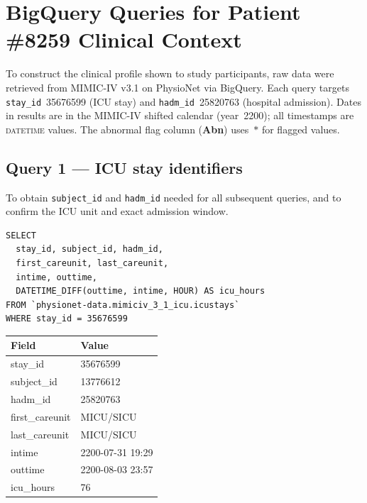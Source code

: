 \documentclass[12pt, a4paper]{article}
\begin{document}
\clearpage
\section{BigQuery Queries for Patient \#8259 Clinical Context}
\label{app:bigquery}

To construct the clinical profile shown to study participants, raw data were
retrieved from MIMIC-IV v3.1 on PhysioNet via BigQuery. Each query targets
\texttt{stay\_id}~35676599 (ICU stay) and \texttt{hadm\_id}~25820763
(hospital admission). Dates in results are in the MIMIC-IV shifted calendar
(year~2200); all timestamps are \textsc{datetime} values.
The abnormal flag column (\textbf{Abn}) uses~$*$ for flagged values.

\subsection*{Query 1 --- ICU stay identifiers}

To obtain \texttt{subject\_id} and \texttt{hadm\_id} needed for all
subsequent queries, and to confirm the ICU unit and exact admission window.

\begin{lstlisting}[style=sql]
SELECT
  stay_id, subject_id, hadm_id,
  first_careunit, last_careunit,
  intime, outtime,
  DATETIME_DIFF(outtime, intime, HOUR) AS icu_hours
FROM `physionet-data.mimiciv_3_1_icu.icustays`
WHERE stay_id = 35676599
\end{lstlisting}

\medskip
\begin{table}[h]
\centering\scriptsize
\begin{tabular}{ll}
\toprule
\textbf{Field} & \textbf{Value} \\
\midrule
stay\_id        & 35676599 \\
subject\_id     & 13776612 \\
hadm\_id        & 25820763 \\
first\_careunit & MICU/SICU \\
last\_careunit  & MICU/SICU \\
intime          & 2200-07-31 19:29 \\
outtime         & 2200-08-03 23:57 \\
icu\_hours      & 76 \\
\bottomrule
\end{tabular}
\end{table}
\end{document}
